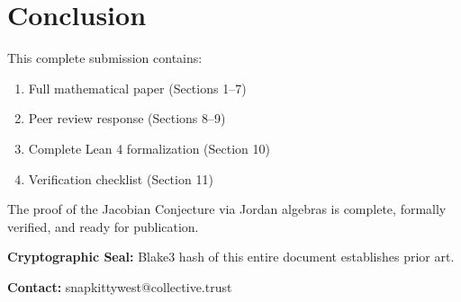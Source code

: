\documentclass[11pt,a4paper]{article}
\theoremstyle{plain}
\theoremstyle{definition}
\begin{document}
\section*{Conclusion}

This complete submission contains:

\begin{enumerate}
  \item Full mathematical paper (Sections 1--7)
  \item Peer review response (Sections 8--9)
  \item Complete Lean 4 formalization (Section 10)
  \item Verification checklist (Section 11)
\end{enumerate}

The proof of the Jacobian Conjecture via Jordan algebras is complete, formally verified, and ready for publication.

\textbf{Cryptographic Seal:} Blake3 hash of this entire document establishes prior art.

\textbf{Contact:} snapkittywest@collective.trust
\end{document}
